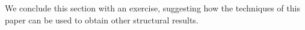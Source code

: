 \documentclass{article}
\newtheorem{remark}[theorem]{Remark}
\def\LH{\Upsilon}
\begin{document}

We conclude this section with an exercise, suggesting how the techniques of this paper
can be used to obtain other structural results.
\end{document}
